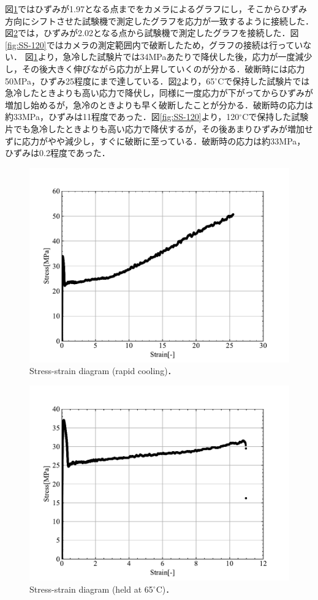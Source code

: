 図\ref{fig:SS-rapid}ではひずみが1.97となる点までをカメラによるグラフにし，そこからひずみ方向にシフトさせた試験機で測定したグラフを応力が一致するように接続した．図\ref{fig:SS-65}では，ひずみが2.02となる点から試験機で測定したグラフを接続した．図\ref{fig:SS-120}ではカメラの測定範囲内で破断したため，グラフの接続は行っていない．
図\ref{fig:SS-rapid}より，急冷した試験片では34MPaあたりで降伏した後，応力が一度減少し，その後大きく伸びながら応力が上昇していくのが分かる．破断時には応力50MPa，ひずみ25程度にまで達している．図\ref{fig:SS-65}より，65$^\circ$Cで保持した試験片では急冷したときよりも高い応力で降伏し，同様に一度応力が下がってからひずみが増加し始めるが，急冷のときよりも早く破断したことが分かる．破断時の応力は約33MPa，ひずみは11程度であった．図\ref{fig:SS-120}より，120$^\circ$Cで保持した試験片でも急冷したときよりも高い応力で降伏するが，その後あまりひずみが増加せずに応力がやや減少し，すぐに破断に至っている．破断時の応力は約33MPa，ひずみは0.2程度であった．
\begin{figure}
  \centering %
  \includegraphics[width=100truemm,clip]{fig/fig_SS-rapid.pdf}
  \caption{Stress-strain diagram (rapid cooling)．}
  \label{fig:SS-rapid}
\end{figure}
\begin{figure}[htbp]
  \centering %
  \includegraphics[width=100truemm,clip]{fig/fig_SS-65.pdf}
  \caption{Stress-strain diagram (held at 65$^\circ$C)．}
  \label{fig:SS-65}
\end{figure}
